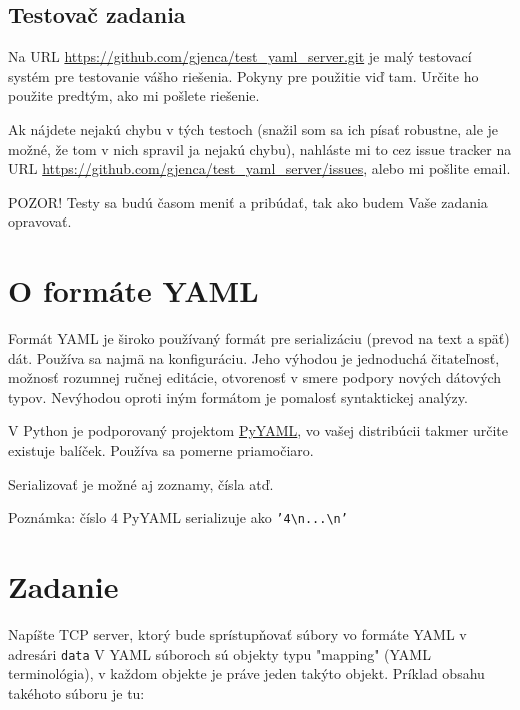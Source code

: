 \documentclass[11pt]{article}
\theoremstyle{definition}
\begin{document}
\subsection{Testovač zadania}

Na URL \url{https://github.com/gjenca/test_yaml_server.git} je malý
testovací systém pre testovanie vášho riešenia. 
Pokyny pre použitie viď tam. Určite ho použite predtým, ako mi pošlete riešenie.

Ak nájdete nejakú chybu v tých testoch (snažil som sa ich písať robustne, ale je možné,
že tom v nich spravil ja nejakú chybu), nahláste mi to cez issue tracker na
URL \url{https://github.com/gjenca/test_yaml_server/issues}, alebo mi pošlite email.

POZOR! Testy sa budú časom meniť
a pribúdať, tak ako budem Vaše zadania opravovať.

\section{O formáte YAML}

Formát YAML je široko používaný formát pre serializáciu (prevod na text a späť) dát. Používa sa najmä na konfiguráciu. Jeho výhodou je jednoduchá čitateľnosť, možnosť rozumnej ručnej editácie, otvorenosť v smere podpory nových dátových typov. Nevýhodou oproti iným formátom je pomalosť syntaktickej analýzy.

V Python je podporovaný projektom \href{https://pyyaml.org/wiki/PyYAMLDocumentation}{PyYAML}, vo vašej distribúcii takmer určite existuje balíček. Používa sa pomerne priamočiaro.

\begin{framed}

\end{framed}
\newpage
Serializovať je možné aj zoznamy, čísla atď.

\begin{framed}

\end{framed}
Poznámka: číslo 4 PyYAML serializuje ako \texttt{'4\textbackslash n...\textbackslash n'}

\section{Zadanie}

Napíšte TCP server, ktorý bude sprístupňovať súbory vo formáte YAML v adresári {\tt data}
V YAML súboroch sú objekty typu "mapping" (YAML terminológia), v každom objekte je práve jeden takýto objekt. Príklad obsahu takéhoto súboru je tu:
\begin{framed}

\end{framed}
\end{document}

